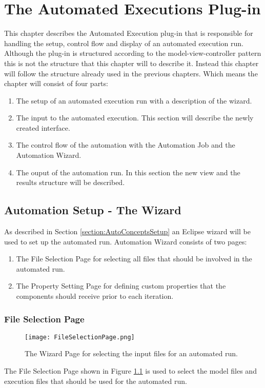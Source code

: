 \chapter{The Automated Executions Plug-in}
This chapter describes the Automated Execution plug-in that is responsible for handling
the setup, control flow and display of an automated execution run.
Although the plug-in is structured according to the model-view-controller pattern this
is not the structure that this chapter will to describe it. Instead this chapter will
follow the structure already used in the previous chapters. Which means the chapter will
consist of four parts:
\begin{enumerate}
 \item The setup of an automated execution run with a description of the wizard.
 \item The input to the automated execution. This section will describe the newly created interface.
 \item The control flow of the automation with the Automation Job and the Automation Wizard.
 \item The ouput of the automation run. In this section the new view and the results structure will
be described.
\end{enumerate}


\section{Automation Setup - The Wizard}
\label{section:AutoWizard}
As described in Section \ref{section:AutoConceptsSetup} an Eclipse wizard will be used to set up the 
automated run. Automation Wizard consists of two pages:
\begin{enumerate}
 \item The File Selection Page for selecting all files that should be involved in the automated run.
 \item The Property Setting Page for defining custom properties that the components should receive prior to
each iteration.
\end{enumerate}


\subsection{File Selection Page}
\begin{figure}[File Selection Page]
  \centering
  \texttt{[image: FileSelectionPage.png]}
  \caption[The Wizard Page for selecting the input files for an automated run.]%
  {The Wizard Page for selecting the input files for an automated run.\protect}
  \label{fig:FileSelectionPage}
\end{figure}
The File Selection Page shown in Figure \ref{fig:FileSelectionPage} is used to select the model 
files and execution files that should be used for the automated run.

